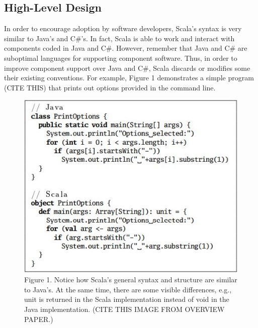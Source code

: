 \documentclass[jou,apacite]{IEEEtran}
\begin{document}
\subsection{High-Level Design}
In order to encourage adoption by software developers, Scala's syntax is very similar to Java's and C\#'s. In fact, Scala is able to work and interact with components coded in Java and C\#. However, remember that Java and C\# are suboptimal languages for supporting component software. Thus, in order to improve component support over Java and C\#, Scala discards or modifies some their existing conventions. For example, Figure 1 demonstrates a simple program (CITE THIS) that prints out options provided in the command line.
\begin{figure}[h]
  \centering
  \includegraphics[width=\columnwidth]{exampl1.JPG}
  \caption{Figure 1. Notice how Scala's general syntax and structure are similar
    to Java's. At the same time, there are some visible differences, e.g., unit
    is returned in the Scala implementation instead of void in the Java
    implementation. (CITE THIS IMAGE FROM OVERVIEW PAPER.)}
  \label{fig:example}
\end{figure}
\end{document}
